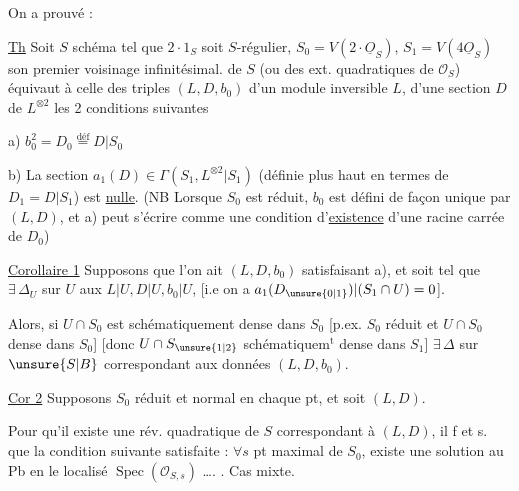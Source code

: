 On a prouvé :

\uline{Th} Soit $S$ schéma tel que $2\cdot1_S$ soit $S$-régulier, $S_0=V(2\cdot\underline O_S)$, $S_1=V(4\underline O_S)$ son premier voisinage infinitésimal.   de $S$ (ou des ext. quadratiques de $\mathcal O_S$) équivaut à celle des triples $(L,D,b_0)$ d'un module inversible $L$,  d'une section $D$ de $L^{\otimes2}$   les 2 conditions suivantes

a)  $b_0^2=D_0\overset{\text{déf}}=D|S_0$

b) La section $a_1(D)\in\Gamma(S_1,L^{\otimes2}|S_1)$ (définie plus haut  en termes de $D_1=D|S_1$) est \uline{nulle}.
(NB Lorsque $S_0$ est réduit, $b_0$ est défini de façon unique par $(L,D)$, et a) peut s'écrire comme une condition d'\uline{existence} d'une racine carrée de $D_0$)

\uline{Corollaire 1} Supposons que l'on ait $(L,D,b_0)$ satisfaisant a), et soit   tel que   $\exists\,\Delta_U$ sur $U$   aux   $L|U,D|U,b_0|U$, [i.e on a $a_1(D_{\unsure{0|1}})|(S_1\cap U)=0$].

Alors, si $U\cap S_0$ est schématiquement dense dans $S_0$ [p.ex. $S_0$ réduit et $U\cap S_0$ dense dans $S_0$] [donc $U\cap S_{\unsure{1|2}}$ schématiquem$^{\mathrm t}$ dense dans $S_1$]  $\exists\,\Delta$ sur $\unsure{S|B}$ correspondant aux données $(L,D,b_0)$.

\uline{Cor 2}  Supposons $S_0$ réduit et normal en chaque pt, et soit $(L,D)$. 

Pour qu'il existe une  rév. quadratique de $S$ correspondant à $(L,D)$, il f et s. que la condition suivante  satisfaite : $\forall s$ pt maximal de $S_0$, existe une solution au Pb en le localisé $\operatorname{Spec}(\mathcal O_{S,s})$ \ldots.
. Cas mixte.

